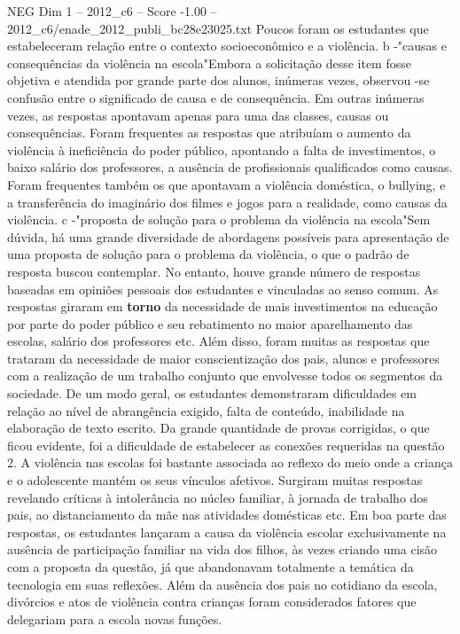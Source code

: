 \begin{textsample}{NEG Dim 1 – 2012\_c6 – Score -1.00 – 2012\_c6/enade\_2012\_publi\_bc28e23025.txt}
Poucos foram os estudantes que estabeleceram relação entre o contexto socioeconômico e a violência. b -"causas e consequências da violência na escola"Embora a solicitação desse item fosse objetiva e atendida por grande parte dos alunos, inúmeras vezes, observou -se confusão entre o significado de causa e de consequência.
Em outras inúmeras vezes, as respostas apontavam apenas para uma das classes, causas ou consequências.
Foram frequentes as respostas que atribuíam o aumento da violência à ineficiência do poder público, apontando a falta de investimentos, o baixo salário dos professores, a ausência de profissionais qualificados como causas.
Foram frequentes também os que apontavam a violência doméstica, o bullying, e a transferência do imaginário dos filmes e jogos para a realidade, como causas da violência. c -"proposta de solução para o problema da violência na escola"Sem dúvida, há uma grande diversidade de abordagens possíveis para apresentação de uma proposta de solução para o problema da violência, o que o padrão de resposta buscou contemplar.
No entanto, houve grande número de respostas baseadas em opiniões pessoais dos estudantes e vinculadas ao senso comum.
As respostas giraram em \textbf{torno} da necessidade de mais investimentos na educação por parte do poder público e seu rebatimento no maior aparelhamento das escolas, salário dos professores etc.
Além disso, foram muitas as respostas que trataram da necessidade de maior conscientização dos pais, alunos e professores com a realização de um trabalho conjunto que envolvesse todos os segmentos da sociedade.
De um modo geral, os estudantes demonstraram dificuldades em relação ao nível de abrangência exigido, falta de conteúdo, inabilidade na elaboração de texto escrito.
Da grande quantidade de provas corrigidas, o que ficou evidente, foi a dificuldade de estabelecer as conexões requeridas na questão 2.
A violência nas escolas foi bastante associada ao reflexo do meio onde a criança e o adolescente mantém os seus vínculos afetivos.
Surgiram muitas respostas revelando críticas à intolerância no núcleo familiar, à jornada de trabalho dos pais, ao distanciamento da mãe nas atividades domésticas etc.
Em boa parte das respostas, os estudantes lançaram a causa da violência escolar exclusivamente na ausência de participação familiar na vida dos filhos, às vezes criando uma cisão com a proposta da questão, já que abandonavam totalmente a temática da tecnologia em suas reflexões.
Além da ausência dos pais no cotidiano da escola, divórcios e atos de violência contra crianças foram considerados fatores que delegariam para a escola novas funções.

\end{textsample}
